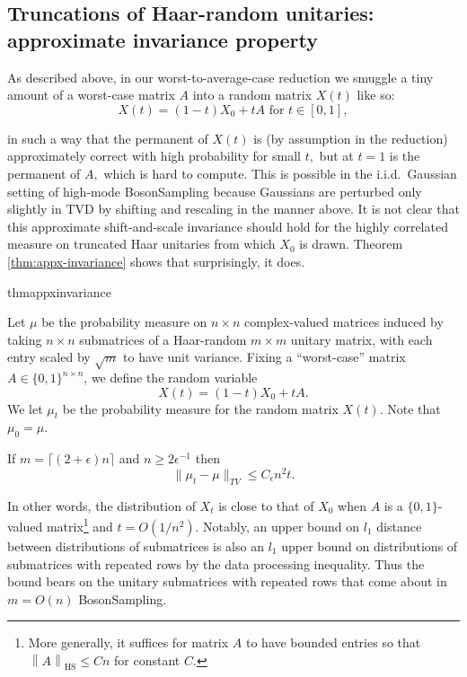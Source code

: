 \documentclass[11pt]{article}
\theoremstyle{plain}
\theoremstyle{plain}
\theoremstyle{plain}
\theoremstyle{plain}
\theoremstyle{plain}
\theoremstyle{plain}
\theoremstyle{plain}
\theoremstyle{remark}
\theoremstyle{remark}
\theoremstyle{plain}
\theoremstyle{plain}
\theoremstyle{plain}
\theoremstyle{plain}
\newcommand{\norm}[1]{\left\lVert#1\right\rVert}
\begin{document}
\subsection{Truncations of Haar-random unitaries: approximate invariance property}\label{ssec:appx-invariance}

As described above, in our worst-to-average-case reduction we smuggle a tiny amount of a worst-case matrix $A$ into a random matrix $X(t)$ like so: 
\begin{equation*}
X(t) = (1-t) X_0 + t A \text{ for } t\in\left[0,1\right],
\end{equation*}

in such a way that the permanent of $X(t)$ is (by assumption in the reduction) approximately correct with high probability for small $t,$ but at $t=1$  is the permanent of $A,$ which is hard to compute. This is possible in the i.i.d.\  Gaussian setting of high-mode BosonSampling because Gaussians are perturbed only slightly in TVD by shifting and rescaling in the manner above. It is not clear that this approximate shift-and-scale invariance should hold for the highly correlated measure on truncated Haar unitaries from which $X_0$ is drawn. Theorem \ref{thm:appx-invariance} shows that surprisingly, it does.


\begin{restatable}{thm}{appxinvariance}
\label{thm:appx-invariance}

Let $\mu$
be the probability measure on $n\times n$ complex-valued matrices induced by taking
$n\times n$  submatrices of a Haar-random $m\times m$ unitary matrix, with each entry scaled by $\sqrt{m}$ to have unit variance.
Fixing
a ``worst-case'' matrix $A\in\{0,1\}^{n \times n}$, we define the random variable
\begin{equation}\label{eq:smuggled}
X(t) = (1-t) X_0 + t A.
\end{equation}
We let $\mu_t$ be the probability measure for the random matrix $X(t)$.
Note that $\mu_0=\mu$.

If $m = \lceil(2+\epsilon)n\rceil$ and $n\geq 2\epsilon^{-1}$ then
\[
\|\mu_t - \mu\|_{TV} \leq C_\epsilon n^2 t.
\]
\end{restatable}

In other words, the distribution of $X_t$ is close to that of $X_0$ when $A$ is a $\{0,1\}$-valued matrix\footnote{More generally, it suffices for matrix $A$ to have bounded entries so that $\norm{A}_{\text{HS}} \leq Cn$ for constant $C$.} and $t = O(1/n^2).$ Notably, an upper bound on $l_1$ distance between distributions of submatrices is also an $l_1$ upper bound on distributions of submatrices with repeated rows by the data processing inequality. Thus the bound bears on the unitary submatrices with repeated rows that come about in $m=O(n)$ BosonSampling.  
\end{document}
